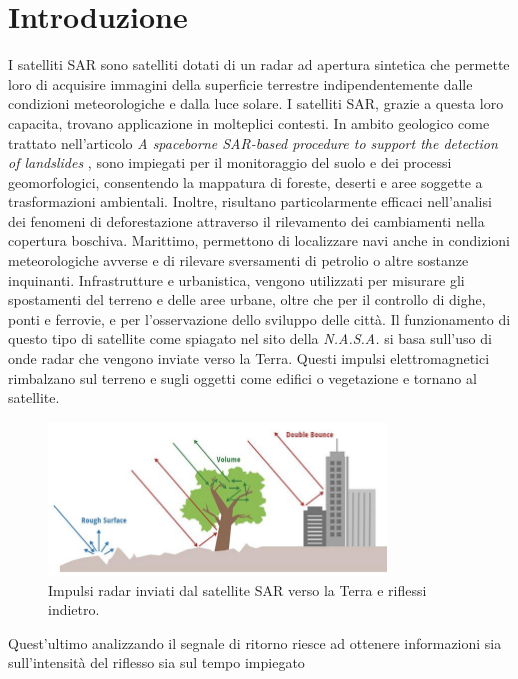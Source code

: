
\chapter{Introduzione}
I satelliti SAR sono satelliti dotati di un radar ad apertura sintetica che permette
loro di acquisire immagini della superficie terrestre indipendentemente dalle 
condizioni meteorologiche e dalla luce solare. I satelliti SAR, grazie a questa loro 
capacita, trovano applicazione in molteplici contesti. In ambito geologico come trattato nell'articolo \textit{A spaceborne SAR-based procedure to support the detection of landslides} \cite{nhess-20-2379-2020}, 
sono impiegati per il monitoraggio del suolo e dei processi 
geomorfologici, consentendo la mappatura di foreste, deserti e aree soggette a 
trasformazioni ambientali. Inoltre, risultano particolarmente efficaci nell’analisi 
dei fenomeni di deforestazione attraverso il rilevamento dei cambiamenti nella 
copertura boschiva. Marittimo, permettono di localizzare navi anche in condizioni 
meteorologiche avverse e di rilevare sversamenti di petrolio o altre sostanze 
inquinanti. Infrastrutture e urbanistica, vengono utilizzati per misurare gli 
spostamenti del terreno e delle aree urbane, oltre che per il controllo di dighe, 
ponti e ferrovie, e per l’osservazione dello sviluppo delle città. Il funzionamento 
di questo tipo di satellite come spiagato nel sito della \textit{N.A.S.A.} \cite{nasa_sar} si basa sull'uso di  onde radar che vengono inviate verso la Terra. 
Questi impulsi elettromagnetici rimbalzano sul terreno e sugli 
oggetti come edifici o vegetazione e tornano al satellite. 
\begin{figure}[H]
    \centering
    \includegraphics[width=0.8\textwidth]{utils/SARPolarization.jpg}
    \caption{Impulsi radar inviati dal satellite SAR verso la Terra e riflessi indietro.}
    \label{fig:sar_scatter}
\end{figure}
Quest'ultimo analizzando il segnale di 
ritorno riesce ad ottenere informazioni sia sull'intensità del riflesso sia sul tempo impiegato 
